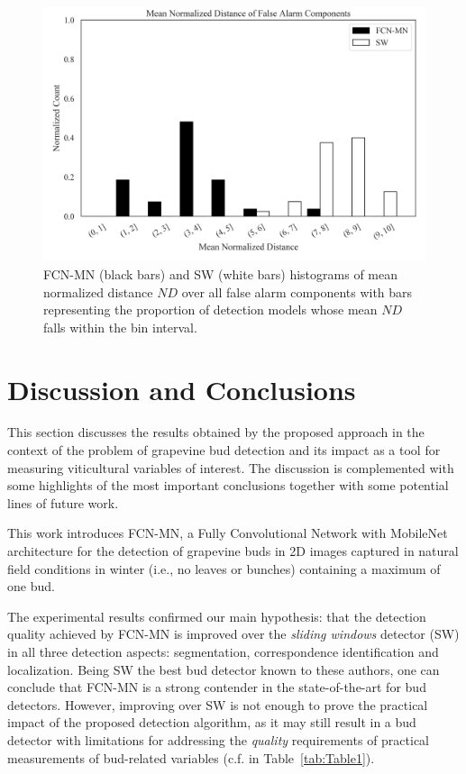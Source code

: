 \documentclass[a4paper,authoryear,review]{elsarticle}
\begin{document}
\begin{figure}[H]%
    \centering
 \includegraphics[width=\textwidth]{Figure7.png}%
\caption{
FCN-MN (black bars) and SW (white bars) histograms of mean normalized distance $ND$ over all false alarm components with bars representing the proportion of detection models whose mean $ND$ falls within the bin interval.
    }
\label{fig:Figure7}
\end{figure}


\section{Discussion and Conclusions}
\label{sec:discussion}

This section discusses the results obtained by the proposed approach in the context of the problem of grapevine bud detection and its impact as a tool for measuring viticultural variables of interest. The discussion is complemented with some highlights of the most important conclusions together with some potential lines of future work.

This work introduces FCN-MN, a Fully Convolutional Network with MobileNet architecture for the detection of grapevine buds in 2D images captured in natural field conditions in winter (i.e., no leaves or bunches) containing a maximum of one bud.

The experimental results confirmed our main hypothesis: that the detection quality achieved by FCN-MN is improved over the \emph{sliding windows} detector (SW) in all three detection aspects: segmentation, correspondence identification and localization. Being SW the best bud detector known to these authors, one can conclude that FCN-MN is a strong contender in the state-of-the-art for bud detectors. 
However, improving over SW is not enough to prove the practical impact of the proposed detection algorithm, as it may still result in a bud detector with limitations for addressing the \emph{quality} requirements of practical measurements of bud-related variables (c.f. in Table~\ref{tab:Table1}). 
\end{document}
